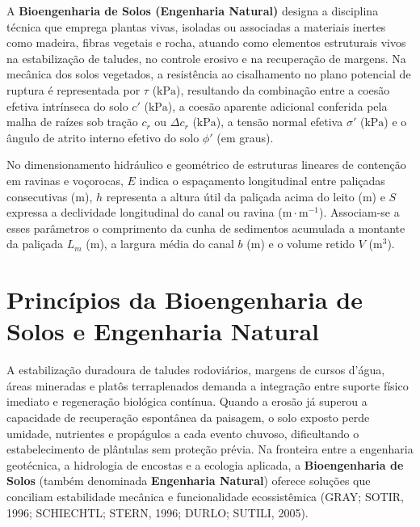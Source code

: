 
\begin{boxSimbolo}
A \textbf{Bioengenharia de Solos (Engenharia Natural)} designa a disciplina técnica que emprega plantas vivas, isoladas ou associadas a materiais inertes como madeira, fibras vegetais e rocha, atuando como elementos estruturais vivos na estabilização de taludes, no controle erosivo e na recuperação de margens. Na mecânica dos solos vegetados, a resistência ao cisalhamento no plano potencial de ruptura é representada por $\tau$ ($\text{kPa}$), resultando da combinação entre a coesão efetiva intrínseca do solo $c'$ ($\text{kPa}$), a coesão aparente adicional conferida pela malha de raízes sob tração $c_r$ ou $\Delta c_r$ ($\text{kPa}$), a tensão normal efetiva $\sigma'$ ($\text{kPa}$) e o ângulo de atrito interno efetivo do solo $\phi'$ (em graus).

No dimensionamento hidráulico e geométrico de estruturas lineares de contenção em ravinas e voçorocas, $E$ indica o espaçamento longitudinal entre paliçadas consecutivas ($\text{m}$), $h$ representa a altura útil da paliçada acima do leito ($\text{m}$) e $S$ expressa a declividade longitudinal do canal ou ravina ($\text{m}\cdot\text{m}^{-1}$). Associam-se a esses parâmetros o comprimento da cunha de sedimentos acumulada a montante da paliçada $L_m$ ($\text{m}$), a largura média do canal $b$ ($\text{m}$) e o volume retido $V$ ($\text{m}^3$).
\end{boxSimbolo}

\section{Princípios da Bioengenharia de Solos e Engenharia Natural}

A estabilização duradoura de taludes rodoviários, margens de cursos d'água, áreas mineradas e platôs terraplenados demanda a integração entre suporte físico imediato e regeneração biológica contínua. Quando a erosão já superou a capacidade de recuperação espontânea da paisagem, o solo exposto perde umidade, nutrientes e propágulos a cada evento chuvoso, dificultando o estabelecimento de plântulas sem proteção prévia. Na fronteira entre a engenharia geotécnica, a hidrologia de encostas e a ecologia aplicada, a \textbf{Bioengenharia de Solos} (também denominada \textbf{Engenharia Natural}) oferece soluções que conciliam estabilidade mecânica e funcionalidade ecossistêmica (GRAY; SOTIR, 1996; SCHIECHTL; STERN, 1996; DURLO; SUTILI, 2005).

